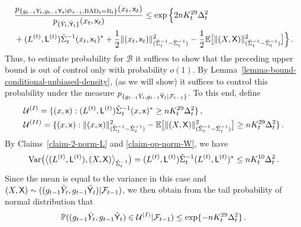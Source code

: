 \documentclass[11pt]{article}
\numberwithin{equation}{section}
\begin{document}
\begin{align*}
    & \frac{ p_{\{ g_{t-1} Y_t , g_{t-1} \mathsf{Y}_t | \mathfrak{S}_{t-1} , \mathrm{BAD}_t = \mathrm{B}_t \}} (x_{t}, \mathsf{x}_t) }{ p_{\{ \Check{Y}_t , \Check{\mathsf{Y}}_t  \}} (x_{t}, \mathsf{x}_t) } \leq \exp \Big\{ 2 n K_{t}^{29} \Delta_{t}^2 \\
    &+  ( L^{(t)} , \mathsf{L}^{(t)} ) \Tilde{\Sigma}_{t}^{-1} ( x_{t},\mathsf{x}_{t} )^{*}
    + \frac{1}{2} \| ( x_{t} , \mathsf{x}_{t} ) \|^2_{ (\Tilde{\Sigma}_{t}^{-1} - \Check{\Sigma}_{t}^{-1}) } - \frac{1}{2} \mathbb{E} \big[ \| (X , \mathsf{X} ) \|^2_{ (\Tilde{\Sigma}_{t}^{-1} - \Check{\Sigma}_{t}^{-1}) } \big]  \Big\} \,.
\end{align*}
Thus, to estimate probability for $\mathcal B$ it suffices to show that the preceding upper bound is out of control only with probability $o(1)$. By  Lemma~\ref{lemma-bound-conditional-unbiased-density}, (as we will show) it suffices to control this probability under the measure $p_{\{ g_{t-1} \Tilde{Y}_t , g_{t-1} \Tilde{\mathsf{Y}}_t | \mathcal{F}_{t-1}  \}}$. To this end,  define 
\begin{align*}
    & \mathcal{U}^{(I)} = \{  (x,\mathsf{x}) : (L^{(t)},\mathsf{L}^{(t)}) \Tilde{\Sigma}_{t}^{-1} (x,\mathsf{x})^{*} \geq n K_{t}^{29} \Delta_{t}^{2} \} \,, \\
    & \mathcal{U}^{(II)} = \{ (x,\mathsf{x}) : \| (x,\mathsf{x}) \|_{(\Tilde{\Sigma}_{t}^{-1} - \Check{\Sigma}_{t}^{-1})}^2  - \mathbb{E} \big[ \| (X,\mathsf{X} ) \|^2_{ (\Tilde{\Sigma}_{t}^{-1} - \Check{\Sigma}_{t}^{-1}) } \big] \geq n K_{t}^{29} \Delta_{t}^{2} \} \,.
\end{align*}
By Claims~\ref{claim-2-norm-L} and \ref{claim-op-norm-W}, we have
\begin{align*}
    \mathrm{Var} \big( \big\langle (L^{(t)},\mathsf{L}^{(t)}) , (X,\mathsf{X}) \big\rangle_{\Tilde{\Sigma}_{t}^{-1}} \big) = (L^{(t)},\mathsf{L}^{(t)}) \Tilde{\Sigma}_{t}^{-1} (L^{(t)},\mathsf{L}^{(t)})^{*} \leq n K_{t}^{10} \Delta_{t}^2\,.   
\end{align*}
Since the mean is equal to the variance in this case and  $(X,\mathsf{X}) \sim (( g_{t-1} \Tilde{Y}_t, g_{t-1} \Tilde{\mathsf{Y}}_t ) | \mathcal{F}_{t-1})$, we then obtain from the tail probability of normal distribution that
\begin{align*}
        \mathbb{P} ( ( g_{t-1} \Tilde{Y}_t, g_{t-1} \Tilde{\mathsf{Y}}_t ) \in \mathcal{U}^{(I)} | \mathcal{F}_{t-1} )\leq \exp \{  - n K_{t}^{29} \Delta_{t}^2 \} \,.
\end{align*}
\end{document}

